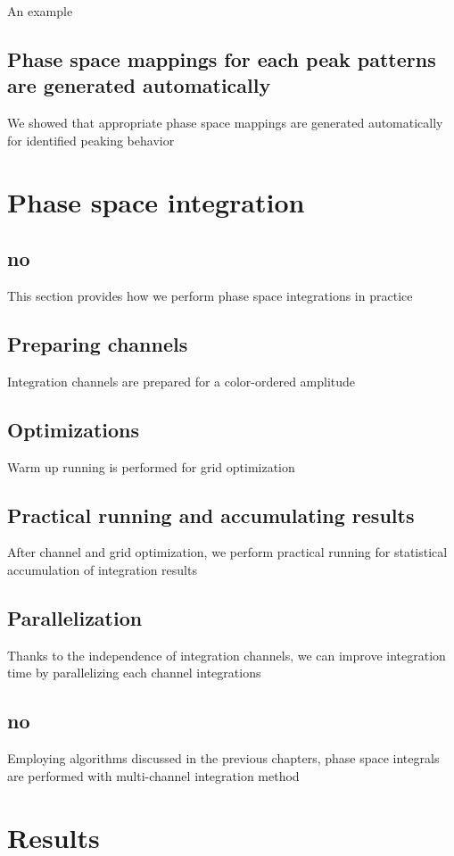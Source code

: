 \documentclass{book}
\begin{document}
An example

\subsection{Phase space mappings for each peak patterns are generated automatically}
We showed that appropriate phase space mappings are generated automatically for identified peaking behavior

\section{Phase space integration}
\subsection{no}
This section provides how we perform phase space integrations in practice

\subsection{Preparing channels}
Integration channels are prepared for a color-ordered amplitude

\subsection{Optimizations}
Warm up running is performed for grid optimization 

\subsection{Practical running and accumulating results}
After channel and grid optimization, we perform practical running for statistical accumulation of integration results

\subsection{Parallelization}
Thanks to the independence of integration channels, we can improve integration time by parallelizing each channel integrations

\subsection{no}
Employing algorithms discussed in the previous chapters, phase space integrals are performed with multi-channel integration method

\section{Results}
\end{document}
